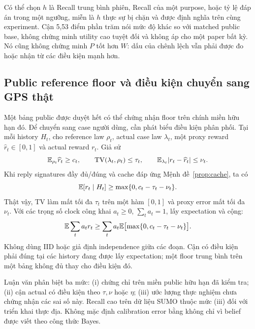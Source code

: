 Có thể chọn $h$ là Recall trung bình phiên, Recall của một purpose, hoặc tỷ lệ đáp án trong một
ngưỡng, miễn là $h$ thực sự bị chặn và được định nghĩa trên cùng experiment. Cận 5,53 điểm phần
trăm nói mức độ khác so với matched public base, không chứng minh utility cao tuyệt đối và không
áp cho một paper bất kỳ. Nó cũng không chứng minh $P$ tốt hơn $W$: dấu của chênh lệch vẫn phải
được đo hoặc nhận từ các điều kiện mạnh hơn.

\subsection{Public reference floor và điều kiện chuyển sang GPS thật}
Một bảng public được duyệt hết có thể chứng nhận floor trên chính miền hữu hạn đó. Để chuyển sang
case người dùng, cần phát biểu điều kiện phân phối. Tại mỗi history $H_t$, cho reference law
$\rho_t$, actual case law $\lambda_t$, một proxy reward $\widehat r_t\in[0,1]$ và actual reward $r_t$.
Giả sử
\begin{equation}
\mathbb E_{\rho_t}\widehat r_t\ge c_t,\qquad
\operatorname{TV}(\lambda_t,\rho_t)\le\tau_t,\qquad
\mathbb E_{\lambda_t}|r_t-\widehat r_t|\le\nu_t.
\label{eq:floor-assumptions}
\end{equation}
Khi reply signatures đầy đủ/đúng và cache đáp ứng Mệnh đề~\ref{prop:cache}, ta có
\begin{equation}
\mathbb E[r_t\mid H_t]\ge\max\{0,c_t-\tau_t-\nu_t\}.
\label{eq:floor-transfer}
\end{equation}
Thật vậy, TV làm mất tối đa $\tau_t$ trên một hàm $[0,1]$ và proxy error mất tối đa $\nu_t$.
Với các trọng số clock công khai $a_t\ge0$, $\sum_ta_t=1$, lấy expectation và cộng:
\begin{equation}
\mathbb E\sum_ta_tr_t\ge\sum_ta_t\mathbb E\bigl[\max\{0,c_t-\tau_t-\nu_t\}\bigr].
\label{eq:session-floor}
\end{equation}
Không dùng IID hoặc giả định independence giữa các đoạn. Cận có điều kiện phải đúng tại các history
đang được lấy expectation; một floor trung bình trên một bảng không đủ thay cho điều kiện đó.

Luận văn phân biệt ba mức: (i) chứng chỉ trên miền public hữu hạn đã kiểm tra; (ii) cận actual
có điều kiện theo $\tau,\nu$ hoặc $\eta$; (iii) ước lượng thực nghiệm chưa chứng nhận các sai số này.
Recall cao trên dữ liệu SUMO thuộc mức (iii) đối với triển khai thực địa. Không mặc định calibration
error bằng không chỉ vì belief được viết theo công thức Bayes.


